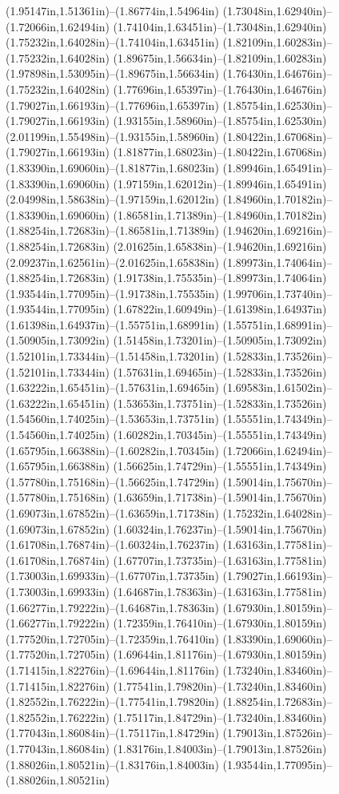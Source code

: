 (1.95147in,1.51361in)--(1.86774in,1.54964in) (1.73048in,1.62940in)--(1.72066in,1.62494in) (1.74104in,1.63451in)--(1.73048in,1.62940in) (1.75232in,1.64028in)--(1.74104in,1.63451in) (1.82109in,1.60283in)--(1.75232in,1.64028in) (1.89675in,1.56634in)--(1.82109in,1.60283in) (1.97898in,1.53095in)--(1.89675in,1.56634in) (1.76430in,1.64676in)--(1.75232in,1.64028in) (1.77696in,1.65397in)--(1.76430in,1.64676in) (1.79027in,1.66193in)--(1.77696in,1.65397in) (1.85754in,1.62530in)--(1.79027in,1.66193in) (1.93155in,1.58960in)--(1.85754in,1.62530in) (2.01199in,1.55498in)--(1.93155in,1.58960in) (1.80422in,1.67068in)--(1.79027in,1.66193in) (1.81877in,1.68023in)--(1.80422in,1.67068in) (1.83390in,1.69060in)--(1.81877in,1.68023in) (1.89946in,1.65491in)--(1.83390in,1.69060in) (1.97159in,1.62012in)--(1.89946in,1.65491in) (2.04998in,1.58638in)--(1.97159in,1.62012in) (1.84960in,1.70182in)--(1.83390in,1.69060in) (1.86581in,1.71389in)--(1.84960in,1.70182in) (1.88254in,1.72683in)--(1.86581in,1.71389in) (1.94620in,1.69216in)--(1.88254in,1.72683in) (2.01625in,1.65838in)--(1.94620in,1.69216in) (2.09237in,1.62561in)--(2.01625in,1.65838in) (1.89973in,1.74064in)--(1.88254in,1.72683in) (1.91738in,1.75535in)--(1.89973in,1.74064in) (1.93544in,1.77095in)--(1.91738in,1.75535in) (1.99706in,1.73740in)--(1.93544in,1.77095in) (1.67822in,1.60949in)--(1.61398in,1.64937in) (1.61398in,1.64937in)--(1.55751in,1.68991in) (1.55751in,1.68991in)--(1.50905in,1.73092in) (1.51458in,1.73201in)--(1.50905in,1.73092in) (1.52101in,1.73344in)--(1.51458in,1.73201in) (1.52833in,1.73526in)--(1.52101in,1.73344in) (1.57631in,1.69465in)--(1.52833in,1.73526in) (1.63222in,1.65451in)--(1.57631in,1.69465in) (1.69583in,1.61502in)--(1.63222in,1.65451in) (1.53653in,1.73751in)--(1.52833in,1.73526in) (1.54560in,1.74025in)--(1.53653in,1.73751in) (1.55551in,1.74349in)--(1.54560in,1.74025in) (1.60282in,1.70345in)--(1.55551in,1.74349in) (1.65795in,1.66388in)--(1.60282in,1.70345in) (1.72066in,1.62494in)--(1.65795in,1.66388in) (1.56625in,1.74729in)--(1.55551in,1.74349in) (1.57780in,1.75168in)--(1.56625in,1.74729in) (1.59014in,1.75670in)--(1.57780in,1.75168in) (1.63659in,1.71738in)--(1.59014in,1.75670in) (1.69073in,1.67852in)--(1.63659in,1.71738in) (1.75232in,1.64028in)--(1.69073in,1.67852in) (1.60324in,1.76237in)--(1.59014in,1.75670in) (1.61708in,1.76874in)--(1.60324in,1.76237in) (1.63163in,1.77581in)--(1.61708in,1.76874in) (1.67707in,1.73735in)--(1.63163in,1.77581in) (1.73003in,1.69933in)--(1.67707in,1.73735in) (1.79027in,1.66193in)--(1.73003in,1.69933in) (1.64687in,1.78363in)--(1.63163in,1.77581in) (1.66277in,1.79222in)--(1.64687in,1.78363in) (1.67930in,1.80159in)--(1.66277in,1.79222in) (1.72359in,1.76410in)--(1.67930in,1.80159in) (1.77520in,1.72705in)--(1.72359in,1.76410in) (1.83390in,1.69060in)--(1.77520in,1.72705in) (1.69644in,1.81176in)--(1.67930in,1.80159in) (1.71415in,1.82276in)--(1.69644in,1.81176in) (1.73240in,1.83460in)--(1.71415in,1.82276in) (1.77541in,1.79820in)--(1.73240in,1.83460in) (1.82552in,1.76222in)--(1.77541in,1.79820in) (1.88254in,1.72683in)--(1.82552in,1.76222in) (1.75117in,1.84729in)--(1.73240in,1.83460in) (1.77043in,1.86084in)--(1.75117in,1.84729in) (1.79013in,1.87526in)--(1.77043in,1.86084in) (1.83176in,1.84003in)--(1.79013in,1.87526in) (1.88026in,1.80521in)--(1.83176in,1.84003in) (1.93544in,1.77095in)--(1.88026in,1.80521in) 